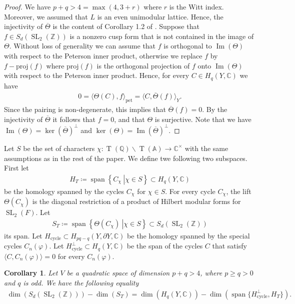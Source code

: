 \documentclass[11pt]{article} %
\newcommand{\8}{\infty}
\newcommand{\Z}{\mathbb{Z}}
\newcommand{\Tbf}{\operatorname{T}}
\newcommand{\cycle}{\operatorname{cycle}}
\newcommand{\Span}{\operatorname{span}}
\newcommand{\SL}{\operatorname{SL}}
\newcommand{\A}{\mathbb{A}}
\newcommand{\Q}{\mathbb{Q}}
\newcommand{\C}{\mathbb{C}}
\newcommand{\proj}{\textrm{proj}}
\newcommand{\im}{\operatorname{Im}}
\theoremstyle{mytheoremstyle}
\newtheorem{cor}{Corollary}[thm]
\theoremstyle{remark}
\numberwithin{equation}{section}
\begin{document}
\begin{proof}
    We have $p+q > 4=\max(4,3+r)$ where $r$ is the Witt index. Moreover, we assumed that $L$ is an even unimodular lattice. Hence, the injectivity of $\overline{\Theta}$ is the content of Corollary 1.2 of \cite{bfinj}. Suppose that $f \in S_{d}(\SL_2(\Z))$ is a nonzero cusp form that is not contained in the image of $\Theta$. Without loss of generality we can assume that $f$ is orthogonal to $\im(\Theta)$ with respect to the Peterson inner product, otherwise we replace $f$ by $f-\proj(f)$ where $\proj(f)$ is the orthogonal projection of $f$ onto $\im(\Theta)$ with respect to the Peterson inner product. Hence, for every $C \in H_q(Y,\C)$ we have
    \begin{align}
        0=\langle \Theta(C),f \rangle_{\operatorname{pet}} = \langle C,\overline{\Theta}(f) \rangle_Y.
    \end{align}
    Since the pairing is non-degenerate, this implies that $\overline{\Theta}(f)=0$. By the injectivity of $\overline{\Theta}$ it follows that $f=0$, and that $\Theta$ is surjective. Note that we have $\im(\Theta)=\ker(\overline{\Theta})^\perp$ and $\ker(\Theta)=\im(\overline{\Theta})^\perp$.
\end{proof}

Let $S$ be the set of characters $\chi \colon \Tbf(\Q)\backslash \Tbf(\A) \longrightarrow \C^\times$ with the same assumptions as in the rest of the paper. We define twe following two subspaces. First let  
\begin{align}
    H_T \coloneqq \Span \left \{ \left . C_\chi \ \right \vert  \chi \in S\right \} \subset H_q(Y,\C)
\end{align}
be the homology spanned by the cycles $C_\chi$ for $\chi \in S$. For every cycle $C_\chi$, the lift $\Theta(C_\chi)$ is the diagonal restriction of a product of Hilbert modular forms for $\SL_2(F)$. Let
\begin{align}
    S_T \coloneqq \Span \left \{ \left . \Theta(C_\chi) \ \right \vert  \chi \in S\right \} \subset S_{d}(\SL_2(\Z))
\end{align}
its span.
Let $H_{\cycle} \subset H_{pq-q}(Y,\partial Y,\C)$ be the homology spanned by the special cycles $C_n(\varphi)$. 
Let $H_{\cycle}^\perp \subset H_q(Y,\C)$ be the span of the cycles $C$ that satisfy $\langle C,C_n(\varphi) \rangle=0$ for every $C_n(\varphi)$. 

\begin{cor} Let $V$ be a quadratic space of dimension $p+q>4$, where $p \geq q>0$ and $q$ is odd. We have the following equality
\begin{align}
    \dim \left ( S_{d}(\SL_2(\Z)) \right )-\dim (S_T) = \dim \left ( H_q(Y,\C) \right ) -\dim \left ( \Span \{ H_{\cycle}^\perp , H_T \} \right ).
\end{align}
\end{cor}
\end{document}
